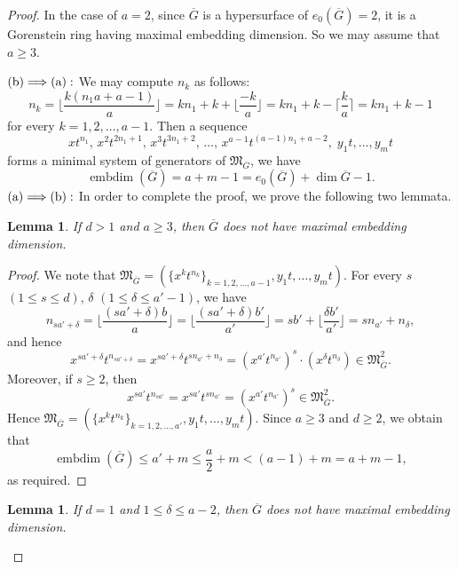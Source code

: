 \documentclass[12pt]{amsart}
\newtheorem{lem}[thm]{Lemma}
\theoremstyle{definition}
\theoremstyle{remark}
\numberwithin{equation}{section}
\DeclareMathOperator{\emb}{embdim}
\newcommand{\MM}{\mathfrak M}
\begin{document}
\begin{proof}
In the case of $a=2$, since $\overline{G}$ is a hypersurface of $e_0(\overline{G})=2$, it is a Gorenstein ring having maximal embedding dimension. So we may assume that $a \ge 3$. 
\par \vspace{2mm} \par \noindent 
$\rm{(b)} \Longrightarrow \rm{(a)}:$ 
We may compute $n_k$ as follows:
\[
n_k%
= \lfloor \frac{k(n_1a+a-1)}{a} \rfloor
=kn_1+k+\lfloor \frac{-k}{a} \rfloor =kn_1+k-\lceil \frac{k}{a} \rceil
= kn_1+k-1
\]
for every $k=1,2,\ldots,a-1$. 
Then a sequence 
\[
xt^{n_1},\,x^2t^{2n_1+1},\, x^{3}t^{3n_1+2}, \, \ldots, \, 
x^{a-1}t^{(a-1)n_1+a-2},\; y_1t,\ldots,y_mt
\]
forms a minimal system of generators of $\MM_{\overline{G}}$, we have 
\[
\emb(\overline{G})=a+m-1=e_0(\overline{G})+\dim \overline{G}-1. 
\]
$\rm{(a)} \Longrightarrow \rm{(b)}:$ 
In order to complete the proof, we prove the following two lemmata.  


\begin{lem} \label{MaxEmb-1}
If $d>1$ and $a \ge 3$, then $\overline{G}$ does not have maximal embedding dimension. 
\end{lem}

\begin{proof}
We note that $\MM_{\overline{G}}=(\{x^kt^{n_k}\}_{k=1,2,\ldots,a-1},
y_1t,\ldots,y_mt)$. 
For every $s$ $(1 \le s \le d)$, $\delta$ $(1 \le \delta \le a'-1)$, 
we have 
\[
n_{sa'+\delta}=\lfloor \frac{(sa'+\delta)b}{a} \rfloor
=\lfloor \frac{(sa'+\delta)b'}{a'} \rfloor
=sb'+\lfloor \frac{\delta b'}{a'} \rfloor
=sn_{a'}+n_{\delta}, 
\]
and hence 
\[
x^{sa'+\delta}t^{n_{sa'+\delta}} = x^{sa'+\delta}t^{sn_{a'}+n_{\delta}}
=(x^{a'}t^{n_{a'}})^s \cdot (x^{\delta}t^{n_{\delta}}) \in \MM_{\overline{G}}^2. 
\]
Moreover, if $s \ge 2$, then 
\[
x^{sa'}t^{n_{sa'}} = x^{sa'}t^{sn_{a'}} = (x^{a'}t^{n_{a'}})^s \in   \MM_{\overline{G}}^2. 
\]
Hence $\MM_{\overline{G}}=(\{x^kt^{n_k}\}_{k=1,2,\ldots,a'},y_1t,\ldots,y_mt)$.
Since $a \ge 3$ and $d \ge 2$, we obtain that 
\[
\emb(\overline{G})\le a'+m \le \frac{a}{2}+m < (a-1)+m=a+m-1, 
\]
as required. 
\end{proof}

\begin{lem} \label{MaxEmb-2}
If $d=1$ and $1 \le \delta \le a-2$, then $\overline{G}$ does not have maximal embedding dimension. 
\end{lem}


\end{proof}
\end{document}
